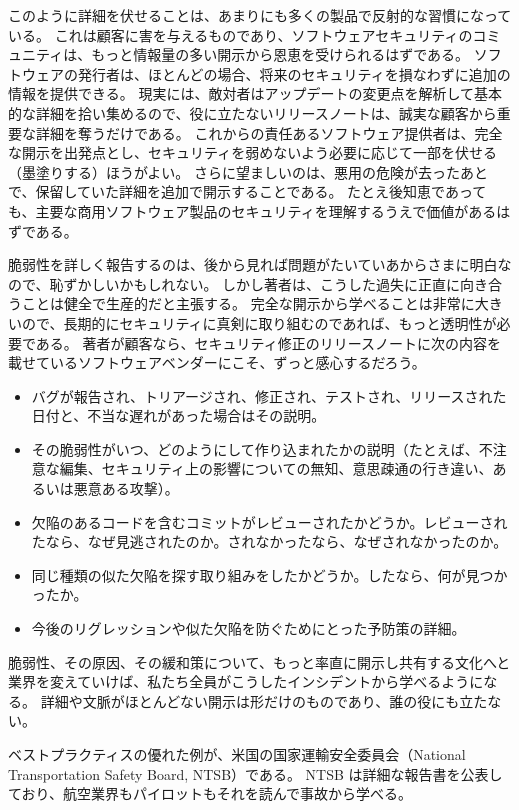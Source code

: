 \documentclass[uplatex]{jsarticle}
\def\label#1{}%
\begin{document}
このように詳細を伏せることは、あまりにも多くの製品で反射的な習慣になっている。
これは顧客に害を与えるものであり、ソフトウェアセキュリティのコミュニティは、もっと情報量の多い開示から恩恵を受けられるはずである。
ソフトウェアの発行者は、ほとんどの場合、将来のセキュリティを損なわずに追加の情報を提供できる。
現実には、敵対者はアップデートの変更点を解析して基本的な詳細を拾い集めるので、役に立たないリリースノートは、誠実な顧客から重要な詳細を奪うだけである。
これからの責任あるソフトウェア提供者は、完全な開示を出発点とし、セキュリティを弱めないよう必要に応じて一部を伏せる（墨塗りする）ほうがよい。
さらに望ましいのは、悪用の危険が去ったあとで、保留していた詳細を追加で開示することである。
たとえ後知恵であっても、主要な商用ソフトウェア製品のセキュリティを理解するうえで価値があるはずである。

脆弱性を詳しく報告するのは、後から見れば問題がたいていあからさまに明白なので、恥ずかしいかもしれない。
しかし著者は、こうした過失に正直に向き合うことは健全で生産的だと主張する。
完全な開示から学べることは非常に大きいので、長期的にセキュリティに真剣に取り組むのであれば、もっと透明性が必要である。
著者が顧客なら、セキュリティ修正のリリースノートに次の内容を載せているソフトウェアベンダーにこそ、ずっと感心するだろう。
\begin{itemize}
\item バグが報告され、トリアージされ、修正され、テストされ、リリースされた日付と、不当な遅れがあった場合はその説明。
\item その脆弱性がいつ、どのようにして作り込まれたかの説明（たとえば、不注意な編集、セキュリティ上の影響についての無知、意思疎通の行き違い、あるいは悪意ある攻撃）。
\item 欠陥のあるコードを含むコミットがレビューされたかどうか。レビューされたなら、なぜ見逃されたのか。されなかったなら、なぜされなかったのか。
\item 同じ種類の似た欠陥を探す取り組みをしたかどうか。したなら、何が見つかったか。
\item 今後のリグレッションや似た欠陥を防ぐためにとった予防策の詳細。
\end{itemize}

脆弱性、その原因、その緩和策について、もっと率直に開示し共有する文化へと業界を変えていけば、私たち全員がこうしたインシデントから学べるようになる。
詳細や文脈がほとんどない開示は形だけのものであり、誰の役にも立たない。

\begin{exa}[国家運輸安全委員会]\label{exa:ch14-ntsb}
ベストプラクティスの優れた例が、米国の国家運輸安全委員会（National Transportation Safety Board, NTSB）である。
NTSB は詳細な報告書を公表しており、航空業界もパイロットもそれを読んで事故から学べる。
\end{exa}
\end{document}
